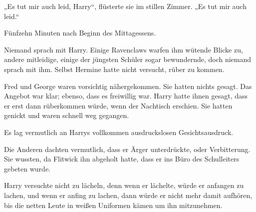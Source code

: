 „Es tut mir auch leid, Harry“, flüsterte sie im stillen Zimmer. „Es tut mir auch leid.“

\later

Fünfzehn Minuten nach Beginn des Mittagessens.

Niemand sprach mit Harry. Einige Ravenclaws warfen ihm wütende Blicke zu, andere mitleidige, einige der jüngsten Schüler sogar bewundernde, doch niemand sprach mit ihm. Selbst Hermine hatte nicht versucht, rüber zu kommen.

Fred und George waren vorsichtig nähergekommen. Sie hatten nichts gesagt. Das Angebot war klar; ebenso, dass es freiwillig war. Harry hatte ihnen gesagt, dass er erst dann rüberkommen würde, wenn der Nachtisch erschien. Sie hatten genickt und waren schnell weg gegangen.

Es lag vermutlich an Harrys vollkommen ausdruckslosen Gesichtsausdruck.

Die Anderen dachten vermutlich, dass er Ärger unterdrückte, oder Verbitterung. Sie wussten, da Flitwick ihn abgeholt hatte, dass er ins Büro des Schulleiters gebeten wurde.

Harry versuchte nicht zu lächeln, denn wenn er lächelte, würde er anfangen zu lachen, und wenn er anfing zu lachen, dann würde er nicht mehr damit aufhören, bis die netten Leute in weißen Uniformen kämen um ihn mitzunehmen.

